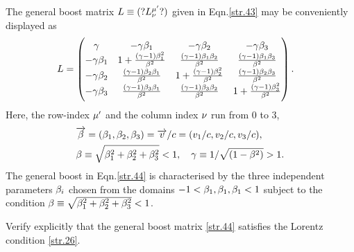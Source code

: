 \begin{small}
The general boost matrix $L\equiv (?L^{{\mu}'}_{{\nu}} ?)$ 
given 
in Eqn.\eqref{str.43} may be conveniently displayed as
\begin{align}\label{str.44}
&  L=\begin{pmatrix} {\gamma}
&-{\gamma}{\beta}_1&-{\gamma}{\beta}_2&-{\gamma}{\beta}_3 \\
 -{\gamma}{\beta}_1&1+ \frac{({\gamma} - 1) {\beta}_{1}^2}
{{\beta}^2} &\frac{({\gamma} - 1) {\beta}_{1} {\beta}_{2}}{{\beta}^2}
&\frac{({\gamma} - 1) {\beta}_{1} {\beta}_{3}}{{\beta}^2}\\
 -{\gamma}{\beta}_2&\frac{({\gamma} - 1) {\beta}_{2}{\beta}_{1}}
{{\beta}^2} &1+ \frac{({\gamma} - 1) {\beta}_{2}^2}{{\beta}^2}
&\frac{({\gamma} - 1) {\beta}_{2} {\beta}_{3}}{{\beta}^2}\\
 -{\gamma}{\beta}_3& \frac{({\gamma} - 1){\beta}_{3}
{\beta}_{1}} {{\beta}^2} &\frac{({\gamma} - 1) {\beta}_{3}
{\beta}_{2}}{{\beta}^2} &1+\frac{({\gamma} - 1) {\beta}_{3}^2
}{{\beta}^2}\\
\end{pmatrix}.
\end{align}
Here, the row-index ${\mu}'$ and the column index ${\nu}$ run 
from 0 to 3, 
\begin{align*}
&\overrightarrow{{\beta}}=({\beta}_1, {\beta}_2,{\beta}_3)=\overrightarrow{v}/c=(v_1/c, 
v_2/c, 
v_3/c),\\ &{\beta} \equiv \sqrt{{\beta}_1^2+{\beta}_2^2+{\beta}_3^2}<1, 
\quad  {\gamma} \equiv 1/\sqrt{(1 -{\beta}^2)}>1.
\end{align*}
The general boost in Eqn.\eqref{str.44} is characterised by 
the three independent parameters ${\beta}_i$ chosen from the 
domains $-1<{\beta}_1,{\beta}_1,{\beta}_1<1$ subject to the 
condition ${\beta} \equiv \sqrt{{\beta}_1^2+{\beta}_2^2+{\beta}_3^2}<1$.

\exm Verify explicitly that the general boost matrix
\eqref{str.44} satisfies the Lorentz condition 
\eqref{str.26}.


\end{small}
